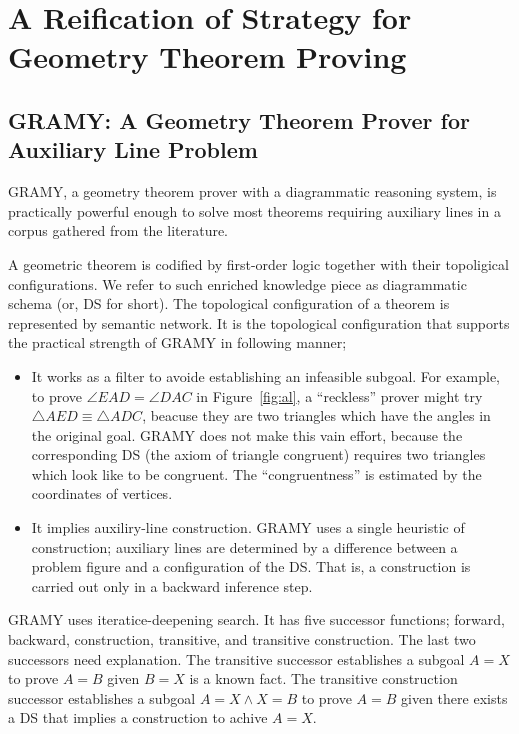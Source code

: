 
\section{A Reification of Strategy for Geometry Theorem Proving}
\label{sec:gw}

\subsection{GRAMY: A Geometry Theorem Prover for Auxiliary Line Problem}

GRAMY, a geometry theorem prover with a diagrammatic reasoning system,
is practically powerful enough to solve most theorems requiring
auxiliary lines in a corpus gathered from the literature.  

A geometric theorem is codified by first-order logic together with their
topoligical configurations\cite{Mazda98}.  We refer to such enriched
knowledge piece as diagrammatic schema (or, DS for short).  The
topological configuration of a theorem is represented by semantic
network.  It is the topological configuration that supports the
practical strength of GRAMY in following manner;

\begin{itemize}
 \item It works as a filter to avoide establishing an infeasible
       subgoal.  For example, to prove $\angle EAD = \angle DAC$ in
       Figure~\ref{fig:al}, a ``reckless'' prover might try $\triangle
       AED \equiv \triangle ADC$, beacuse they are two triangles which
       have the angles in the original goal.  GRAMY does not make this
       vain effort, because the corresponding DS (the axiom of triangle
       congruent) requires two triangles which look like to be
       congruent.  The ``congruentness'' is estimated by the coordinates
       of vertices.
 \item It implies auxiliry-line construction.  GRAMY uses a single
       heuristic of construction; auxiliary lines are determined by a
       difference between a problem figure and a configuration of the
       DS.  That is, a construction is carried out only in a backward
       inference step.
\end{itemize}

GRAMY uses iteratice-deepening search.  It has five successor functions;
forward, backward, construction, transitive, and transitive
construction.  The last two successors need explanation.  The transitive
successor establishes a subgoal $A = X$ to prove $A = B$ given $B = X$
is a known fact.  The transitive construction successor establishes a
subgoal $A = X \wedge X = B$ to prove $A = B$ given there exists a DS that
implies a construction to achive $A = X$.  

